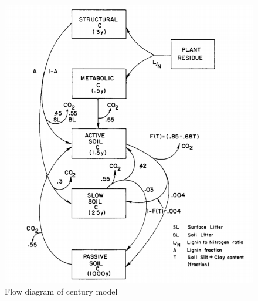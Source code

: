\documentclass[10pt,a4paper]{article}
\begin{document}
\begin{figure}[!h]
\centering
\includegraphics[scale=0.85]{century}
\caption{Flow diagram of century model}
\end{figure}
\end{document}
